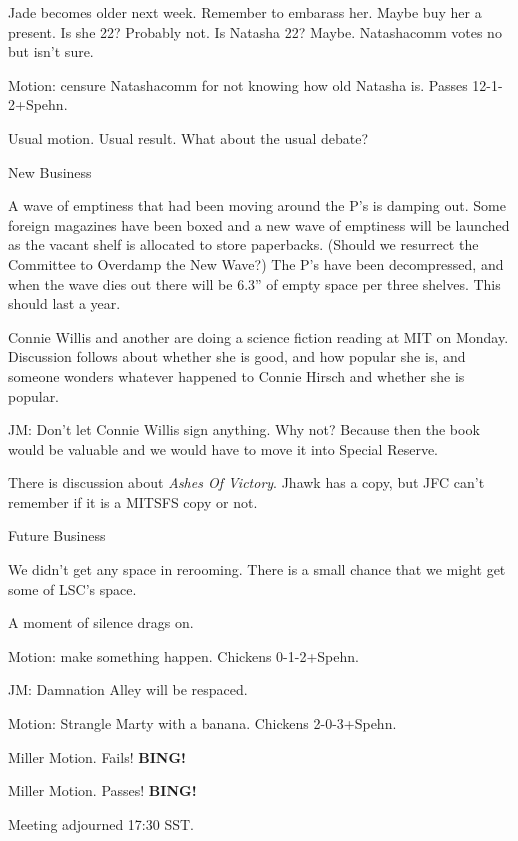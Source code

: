 \documentclass[12pt]{article}
\begin{document}
Jade becomes older next week.  Remember to embarass her.  Maybe buy
her a present.  Is she 22?  Probably not.  Is Natasha 22?  Maybe.
Natashacomm votes no but isn't sure.

Motion: censure Natashacomm for not knowing how old Natasha is.
Passes \hbox{12-1-2+Spehn}.

Usual motion.  Usual result.  What about the usual debate?

\vskip 12pt

\centerline{New Business}

A wave of emptiness that had been moving around the P's is damping
out.  Some foreign magazines have been boxed and a new wave of
emptiness will be launched as the vacant shelf is allocated to store
paperbacks.  (Should we resurrect the Committee to Overdamp the New
Wave?)  The P's have been decompressed, and when the wave dies out
there will be 6.3'' of empty space per three shelves.  This should
last a year.

Connie Willis and another are doing a science fiction reading at MIT
on Monday.  Discussion follows about whether she is good, and how popular
she is, and someone wonders whatever happened to Connie Hirsch and whether
she is popular.

JM: Don't let Connie Willis sign anything.  Why not?  Because then the
book would be valuable and we would have to move it into Special Reserve.

There is discussion about {\it Ashes Of Victory}.  Jhawk has a copy, but
JFC can't remember if it is a MITSFS copy or not.

\vskip 12pt

\centerline{Future Business}

We didn't get any space in rerooming.  There is a small chance that we
might get some of LSC's space.

A moment of silence drags on.

Motion: make something happen.  Chickens \hbox{0-1-2+Spehn}.

JM: Damnation Alley will be respaced.

Motion: Strangle Marty with a banana.  Chickens \hbox{2-0-3+Spehn}.

Miller Motion.  Fails!  {\bf BING!}

Miller Motion.  Passes! {\bf BING!}

Meeting adjourned 17:30 SST.
\end{document}
